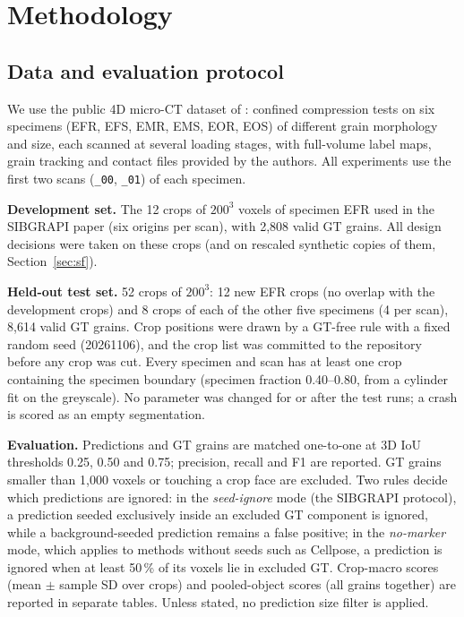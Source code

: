 \documentclass[12pt]{article}
\begin{document}
\section{Methodology}

\subsection{Data and evaluation protocol}

We use the public 4D micro-CT dataset of \citet{pinzon2023,pinzon2025}: confined compression tests on six
specimens (EFR, EFS, EMR, EMS, EOR, EOS) of different grain morphology and size, each scanned at several loading
stages, with full-volume label maps, grain tracking and contact files provided by the authors. All experiments use
the first two scans (\texttt{\_00}, \texttt{\_01}) of each specimen.

\textbf{Development set.} The 12 crops of $200^3$ voxels of specimen EFR used in the SIBGRAPI paper (six origins per
scan), with 2,808 valid GT grains. All design decisions were taken on these crops (and on rescaled synthetic copies
of them, Section~\ref{sec:sf}).

\textbf{Held-out test set.} 52 crops of $200^3$: 12 new EFR crops (no overlap with the development crops) and 8
crops of each of the other five specimens (4 per scan), 8,614 valid GT grains. Crop positions were drawn by a
GT-free rule with a fixed random seed (20261106), and the crop list was committed to the repository before any crop
was cut. Every specimen and scan has at least one crop containing the specimen boundary (specimen fraction
0.40--0.80, from a cylinder fit on the greyscale). No parameter was changed for or after the test runs; a crash is
scored as an empty segmentation.

\textbf{Evaluation.} Predictions and GT grains are matched one-to-one at 3D IoU thresholds 0.25, 0.50 and 0.75;
precision, recall and F1 are reported. GT grains smaller than 1,000 voxels or touching a crop face are excluded.
Two rules decide which predictions are ignored: in the \emph{seed-ignore} mode (the SIBGRAPI protocol), a prediction
seeded exclusively inside an excluded GT component is ignored, while a background-seeded prediction remains a false
positive; in the \emph{no-marker} mode, which applies to methods without seeds such as Cellpose, a prediction is
ignored when at least 50\,\% of its voxels lie in excluded GT. Crop-macro scores (mean $\pm$ sample SD over crops)
and pooled-object scores (all grains together) are reported in separate tables. Unless stated, no prediction size
filter is applied.
\end{document}
